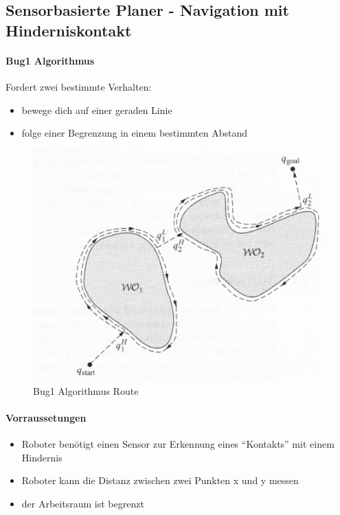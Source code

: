 \subsection{Sensorbasierte Planer - Navigation mit Hinderniskontakt}
\paragraph{Bug1 Algorithmus}
Fordert zwei bestimmte Verhalten:
\begin{itemize}
	\item bewege dich auf einer geraden Linie
	\item folge einer Begrenzung in einem bestimmten Abstand
\end{itemize}
\begin{figure}[H]
	\begin{center}
		\includegraphics[scale=0.5]{Resources/PNG/Bug1.png}
		\caption{Bug1 Algorithmus Route}
		\label{fig:PNG/Bug1.png}
	\end{center}
\end{figure}
\paragraph{Vorraussetungen}
\begin{itemize}
	\item Roboter benötigt einen Sensor zur Erkennung eines \enquote{Kontakts} mit einem Hindernis
	\item Roboter kann die Distanz zwischen zwei Punkten x und y messen
	\item der Arbeitsraum ist begrenzt
\end{itemize}
